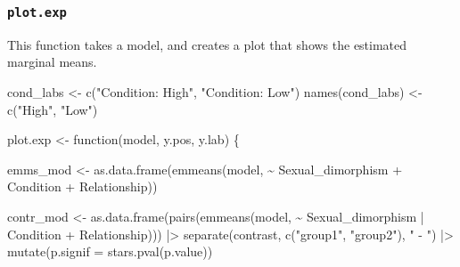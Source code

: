 \documentclass[
  bookmarksnumbered]{article}
\newenvironment{Shaded}{\begin{snugshade}}{\end{snugshade}}
\newcommand{\AttributeTok}[1]{\textcolor[rgb]{0.80,0.80,0.80}{#1}}
\newcommand{\ControlFlowTok}[1]{\textcolor[rgb]{0.94,0.87,0.69}{#1}}
\newcommand{\FunctionTok}[1]{\textcolor[rgb]{0.94,0.94,0.56}{#1}}
\newcommand{\NormalTok}[1]{\textcolor[rgb]{0.80,0.80,0.80}{#1}}
\newcommand{\OtherTok}[1]{\textcolor[rgb]{0.94,0.94,0.56}{#1}}
\newcommand{\SpecialCharTok}[1]{\textcolor[rgb]{0.86,0.64,0.64}{#1}}
\newcommand{\StringTok}[1]{\textcolor[rgb]{0.80,0.58,0.58}{#1}}
\begin{document}
\subsubsection{\texorpdfstring{\texttt{plot.exp}}{plot.exp}}\label{plot.exp}

This function takes a model, and creates a plot that shows the estimated marginal means.

\begin{Shaded}
\begin{Highlighting}[]
\NormalTok{cond\_labs }\OtherTok{\textless{}{-}} \FunctionTok{c}\NormalTok{(}\StringTok{"Condition: High"}\NormalTok{, }\StringTok{"Condition: Low"}\NormalTok{)}
\FunctionTok{names}\NormalTok{(cond\_labs) }\OtherTok{\textless{}{-}} \FunctionTok{c}\NormalTok{(}\StringTok{"High"}\NormalTok{, }\StringTok{"Low"}\NormalTok{)}

\NormalTok{plot.exp }\OtherTok{\textless{}{-}} \ControlFlowTok{function}\NormalTok{(model, y.pos, y.lab) \{}
  
\NormalTok{  emms\_mod }\OtherTok{\textless{}{-}} \FunctionTok{as.data.frame}\NormalTok{(}\FunctionTok{emmeans}\NormalTok{(model,}
                                   \SpecialCharTok{\textasciitilde{}}\NormalTok{ Sexual\_dimorphism }\SpecialCharTok{+}\NormalTok{ Condition }\SpecialCharTok{+}\NormalTok{ Relationship))}
  
\NormalTok{  contr\_mod }\OtherTok{\textless{}{-}} \FunctionTok{as.data.frame}\NormalTok{(}\FunctionTok{pairs}\NormalTok{(}\FunctionTok{emmeans}\NormalTok{(model,}
                                          \SpecialCharTok{\textasciitilde{}}\NormalTok{ Sexual\_dimorphism }\SpecialCharTok{|}\NormalTok{ Condition }\SpecialCharTok{+}\NormalTok{ Relationship))) }\SpecialCharTok{|\textgreater{}}
    \FunctionTok{separate}\NormalTok{(contrast, }\FunctionTok{c}\NormalTok{(}\StringTok{"group1"}\NormalTok{, }\StringTok{"group2"}\NormalTok{), }\StringTok{" {-} "}\NormalTok{) }\SpecialCharTok{|\textgreater{}}
    \FunctionTok{mutate}\NormalTok{(}\AttributeTok{p.signif =} \FunctionTok{stars.pval}\NormalTok{(p.value))}
  

\end{Highlighting}
\end{Shaded}
\end{document}
